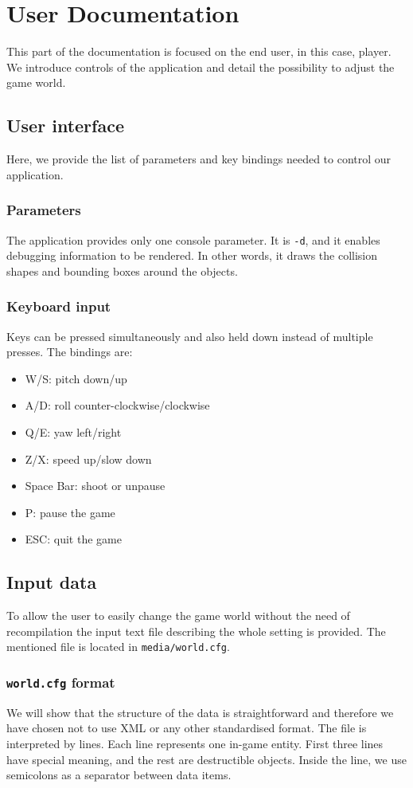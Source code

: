 \chapter{User Documentation}
This part of the documentation is focused on the end user, in this case, player. We introduce controls of the application and detail the possibility to adjust the game world.
\section{User interface}
Here, we provide the list of parameters and key bindings needed to control our application.
\subsection*{Parameters}
The application provides only one console parameter. It is {\tt -d}, and it enables debugging information to be rendered. In other words, it draws the collision shapes and bounding boxes around the objects.
\subsection*{Keyboard input}
Keys can be pressed simultaneously and also held down instead of multiple presses. The bindings are:
\begin{itemize}
\item W/S: pitch down/up
\item A/D: roll counter-clockwise/clockwise 
\item Q/E: yaw left/right
\item Z/X: speed up/slow down
\item Space Bar: shoot or unpause
\item P: pause the game
\item ESC: quit the game
\end{itemize}


\section{Input data}
\label{sec:data}
To allow the user to easily change the game world without the need of recompilation the input text file describing the whole setting is provided. The mentioned file is located in {\tt media/world.cfg}. 

\subsection*{{\tt world.cfg} format}
We will show that the structure of the data is straightforward and therefore we have chosen not to use XML or any other standardised format. The file is interpreted by lines. Each line represents one in-game entity. First three lines have special meaning, and the rest are destructible objects. Inside the line, we use semicolons as a separator between data items.

